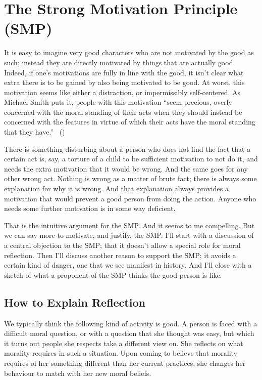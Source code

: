 \documentclass[
  10pt,
  letterpaper,
  twoside]{scrbook}
\begin{document}
\section{The Strong Motivation Principle
(SMP)}\label{thestrongmotivationprinciplesmp}

It is easy to imagine very good characters who are not motivated by the
good as such; instead they are directly motivated by things that are
actually good. Indeed, if one's motivations are fully in line with the
good, it isn't clear what extra there is to be gained by also being
motivated to be good. At worst, this motivation seems like either a
distraction, or impermissibly self-centered. As Michael Smith puts it,
people with this motivation ``seem precious, overly concerned with the
moral standing of their acts when they should instead be concerned with
the features in virtue of which their acts have the moral standing that
they have.'' ~()

There is something disturbing about a person who does not find the fact
that a certain act is, say, a torture of a child to be sufficient
motivation to not do it, and needs the extra motivation that it would be
wrong. And the same goes for any other wrong act. Nothing is wrong as a
matter of brute fact; there is always some explanation for why it is
wrong. And that explanation always provides a motivation that would
prevent a good person from doing the action. Anyone who needs some
further motivation is in some way deficient.

That is the intuitive argument for the SMP. And it seems to me
compelling. But we can say more to motivate, and justify, the SMP. I'll
start with a discussion of a central objection to the SMP; that it
doesn't allow a special role for moral reflection. Then I'll discuss
another reason to support the SMP; it avoids a certain kind of danger,
one that we see manifest in history. And I'll close with a sketch of
what a proponent of the SMP thinks the good person is like.

\subsection{How to Explain Reflection}\label{howtoexplainreflection}

We typically think the following kind of activity is good. A person is
faced with a difficult moral question, or with a question that she
thought was easy, but which it turns out people she respects take a
different view on. She reflects on what morality requires in such a
situation. Upon coming to believe that morality requires of her
something different than her current practices, she changes her
behaviour to match with her new moral beliefs.
\end{document}
